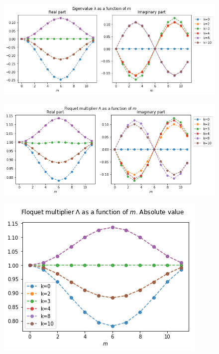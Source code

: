 \documentclass[a4paper,10pt]{article}
\begin{document}
\begin{figure}[h]
    \centering
    \includegraphics[width=.95\textwidth]{assets/theory-2019-08-27-181719526-a8d.png}
\end{figure}

\begin{figure}[h]
    \centering
    \includegraphics[width=.95\textwidth]{assets/theory-2019-08-27-181703429-803.png}
\end{figure}

\begin{figure}[h]
    \centering
    \includegraphics[width=.55\textwidth]{assets/theory-2019-08-27-182315374-a22.png}
\end{figure}

\clearpage
\end{document}
